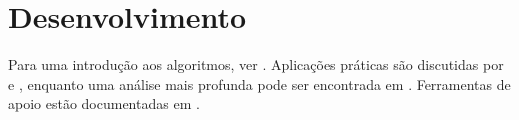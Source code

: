 \section{Desenvolvimento}

\lipsum[1-5]

Para uma introdução aos algoritmos, ver \cite{exemploLivro}. Aplicações práticas
são discutidas por  e ,
enquanto uma análise mais profunda pode ser encontrada em \cite{exemploDissertacao}.
Ferramentas de apoio estão documentadas em .

